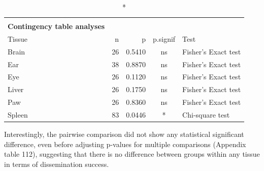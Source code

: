 \documentclass[
  12pt,
  letterpaper,
]{article}
\begin{document}
\begin{longtable}{l|rrcl}
\caption*{
{\large \textbf{Appendix Table 111}} \\ 
{\small \textbf{Contingency table analyses}}
} \\ 
\toprule
\multicolumn{1}{l}{Tissue} & n & p & p.signif & Test \\ 
\midrule\addlinespace[2.5pt]
Brain & 26 & 0.5410 & ns & Fisher's Exact test \\ 
Ear & 38 & 0.8870 & ns & Fisher's Exact test \\ 
Eye & 26 & 0.1120 & ns & Fisher's Exact test \\ 
Liver & 26 & 0.1750 & ns & Fisher's Exact test \\ 
Paw & 26 & 0.8360 & ns & Fisher's Exact test \\ 
Spleen & 83 & 0.0446 & * & Chi-square test \\ 
\bottomrule
\end{longtable}

Interestingly, the pairwise comparison did not show any statistical significant difference, even before adjusting p-values for multiple comparisons (Appendix table 112), suggesting that there is no difference between groups within any tissue in terms of dissemination success.
\end{document}
